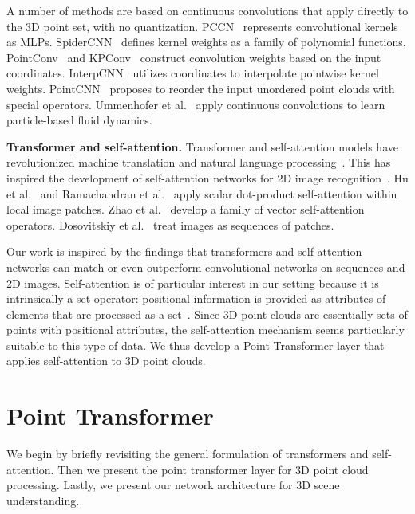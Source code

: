 \documentclass[final]{cvpr}
\newcommand\mypara[1]{\vspace{1mm}\noindent\textbf{#1}}
\begin{document}
A number of methods are based on continuous convolutions that apply directly to the 3D point set, with no quantization. PCCN~\cite{wang2018pccn} represents convolutional kernels as MLPs. SpiderCNN~\cite{xu2018spidercnn} defines kernel weights as a family of polynomial functions. PointConv~\cite{wu2019pointconv} and KPConv~\cite{thomas2019kpconv} construct convolution weights based on the input coordinates. InterpCNN~\cite{mao2019interpolated} utilizes coordinates to interpolate pointwise kernel weights. PointCNN~\cite{li2018pointcnn} proposes to reorder the input unordered point clouds with special operators. Ummenhofer et al.~\cite{Ummenhofer2020} apply continuous convolutions to learn particle-based fluid dynamics.

\mypara{Transformer and self-attention.}
Transformer and self-attention models have revolutionized machine translation and natural language processing~\cite{vaswani2017attention,wu2019pay,Devlin2018,dai2019transformer,Yang2019xlnet}.
This has inspired the development of self-attention networks for 2D image recognition~\cite{hu2019local,ramachandran2019stand,zhao2020san,dosovitskiy2020image}. Hu et al.~\cite{hu2019local} and Ramachandran et al.~\cite{ramachandran2019stand} apply scalar dot-product self-attention within local image patches. Zhao et al.~\cite{zhao2020san} develop a family of vector self-attention operators. Dosovitskiy et al.~\cite{dosovitskiy2020image} treat images as sequences of patches.

Our work is inspired by the findings that transformers and self-attention networks can match or even outperform convolutional networks on sequences and 2D images. 
Self-attention is of particular interest in our setting because it is intrinsically a set operator: positional information is provided as attributes of elements that are processed as a set~\cite{vaswani2017attention,zhao2020san}. Since 3D point clouds are essentially sets of points with positional attributes, the self-attention mechanism seems particularly suitable to this type of data.
We thus develop a Point Transformer layer that applies self-attention to 3D point clouds. 
\section{Point Transformer}
\label{sec:method}
We begin by briefly revisiting the general formulation of transformers and self-attention. Then we present the point transformer layer for 3D point cloud processing. Lastly, we present our network architecture for 3D scene understanding.
\end{document}
